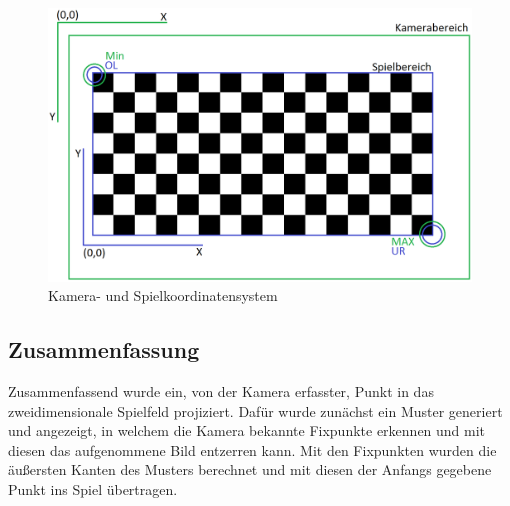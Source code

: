 \begin{figure}[h]
	\centering
	\includegraphics[scale=0.2]{bilder/schachbrettkamera.png}
	\caption{Kamera- und Spielkoordinatensystem}
\end{figure}

\subsection{Zusammenfassung}
Zusammenfassend wurde ein, von der Kamera erfasster, Punkt in das zweidimensionale Spielfeld projiziert. Dafür wurde zunächst ein Muster generiert und angezeigt, in welchem die Kamera bekannte Fixpunkte erkennen und mit diesen das aufgenommene Bild entzerren kann. Mit den Fixpunkten wurden die äußersten Kanten des Musters berechnet und mit diesen der Anfangs gegebene Punkt ins Spiel übertragen.